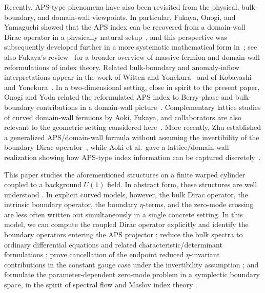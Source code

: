 \documentclass[11pt]{article}
\theoremstyle{definition}
\numberwithin{equation}{section}
\begin{document}
Recently, APS-type phenomena have also been revisited from the physical, bulk-boundary, and domain-wall viewpoints. In particular, Fukaya, Onogi, and Yamaguchi showed that the APS index can be recovered from a domain-wall Dirac operator in a physically natural setup~\cite{Fukaya}, and this perspective was subsequently developed further in a more systematic mathematical form in~\cite{FukayaMatsuo2020}; see also Fukaya's review~\cite{FukayaReview2021} for a broader overview of massive-fermion and domain-wall reformulations of index theory. Related bulk-boundary and anomaly-inflow interpretations appear in the work of Witten and Yonekura~\cite{WittenYonekura2019} and of Kobayashi and Yonekura~\cite{KobayashiYonekura2021}. In a two-dimensional setting, close in spirit to the present paper, Onogi and Yoda related the reformulated APS index to Berry-phase and bulk-boundary contributions in a domain-wall picture~\cite{OnogiYoda2021}. Complementary lattice studies of curved domain-wall fermions by Aoki, Fukaya, and collaborators are also relevant to the geometric setting considered here~\cite{AokiFukaya2022,AokiFukaya2023,AokiFukayaKan2024,AokiSingleCurved2024}. More recently, Zhu established a generalized APS/domain-wall formula without assuming the invertibility of the boundary Dirac operator~\cite{Zhu2023}, while Aoki et al.\ gave a lattice/domain-wall realization showing how APS-type index information can be captured discretely~\cite{Aoki2026}.

This paper studies the aforementioned structures on a finite warped cylinder coupled to a background \(U(1)\) field. 
In abstract form, these structures are well understood \cite{LawsonMichelsohn,BGV,Hijazi,BoossWojciechowski,BaerBallmann2012}. 
In explicit curved models, however, the bulk Dirac operator, the intrinsic boundary operator, the boundary \(\eta\)-terms, and the zero-mode crossing are less often written out simultaneously in a single concrete setting. 
In this model, we can compute the coupled Dirac operator explicitly and identify the boundary operators entering the APS projector \cite{BoossWojciechowski,LeschWojciechowski1996}; 
reduce the bulk spectra to ordinary differential equations and related characteristic/determinant formulations \cite{ScottWojciechowski2000}; 
prove cancellation of the endpoint reduced \(\eta\)-invariant contributions in the constant gauge case under the invertibility assumption \cite{Bunke1995,LeschWojciechowski1996,KirkLesch}; 
and formulate the parameter-dependent zero-mode problem in a symplectic boundary space, in the spirit of spectral flow and Maslov index theory \cite{RobbinSalamon1995,CappellLeeMiller1994,Nicolaescu1995,KirkLesch,vanDenDungenRonge2020,Prokhorova2013,GorokhovskyLesch2013}.
\end{document}
